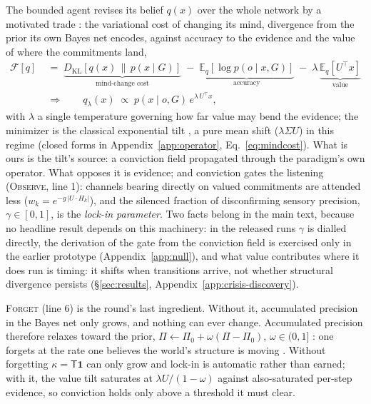 \documentclass[runningheads]{llncs}
\newcommand{\KL}[2]{D_{\mathrm{KL}}\!\left[#1\,\middle\|\,#2\right]}
\newcommand{\Eq}[2]{\mathbb{E}_{#1}\!\left[#2\right]}
\newcommand{\Top}{\mathsf{T}}          %
\newcommand{\bone}{\mathbf{1}}         %
\begin{document}
The bounded agent revises its belief $q(x)$ over the whole network by a motivated trade
\citep{hyland2025}: the variational cost of changing its mind, divergence from the prior its own
Bayes net encodes, against accuracy to the evidence and the value of where the commitments land,
\begin{equation}
\begin{aligned}
\mathcal{F}[q]\;&=\;
\underbrace{\KL{q(x)}{p(x\mid G)}}_{\text{mind-change cost}}
\;-\;\underbrace{\Eq{q}{\log p(o\mid x,G)}}_{\text{accuracy}}
\;-\;\lambda\,\underbrace{\Eq{q}{U^{\!\top}\!x}}_{\text{value}}\\[2pt]
&\Longrightarrow\qquad
q_\lambda(x)\;\propto\;p(x\mid o,G)\,e^{\lambda\,U^{\!\top}\!x},
\end{aligned}
\label{eq:tilted}
\end{equation}
with $\lambda$ a single temperature governing how far value may bend the evidence; the
minimizer is the classical exponential tilt \citep{todorov2009,ortega2013}, a pure mean shift
($\lambda\Sigma U$) in this regime (closed forms in Appendix~\ref{app:operator},
Eq.~\ref{eq:mindcost}). What is ours is the tilt's source: a conviction field propagated
through the paradigm's own operator. What opposes it is evidence; and conviction gates the
listening (\textsc{Observe}, line 1): channels bearing directly on valued commitments are attended less
($w_k=e^{-g\,|U\cdot H_k|}$), and the silenced fraction of disconfirming sensory precision,
$\gamma\in[0,1]$, is the \emph{lock-in parameter}. Two facts belong in the main text, because
no headline result depends on this machinery: in the released runs $\gamma$ is dialled
directly, the derivation of the gate from the conviction field is exercised only in the
earlier prototype (Appendix~\ref{app:null}), and what value contributes where it does run is
timing: it shifts when transitions arrive, not whether structural divergence persists
(\S\ref{sec:results}, Appendix~\ref{app:crisis-discovery}).

\label{sec:temporal}%
\textsc{Forget} (line 6) is the round's last ingredient. Without it, accumulated
precision in the Bayes net only grows, and nothing can ever change. Accumulated precision
therefore relaxes toward the prior,
$\Pi\leftarrow\Pi_0+\omega(\Pi-\Pi_0)$, $\omega\in(0,1]$
\citep{friston2017process,smith2022tutorial}: one forgets at the rate one believes the world's
structure is moving \citep{mathys2011}. Without forgetting $\kappa=\Top\bone$ can only grow and
lock-in is automatic rather than earned; with it, the value tilt saturates at
$\lambda U/(1-\omega)$ against also-saturated per-step evidence, so conviction holds only above
a threshold it must clear.
\end{document}
